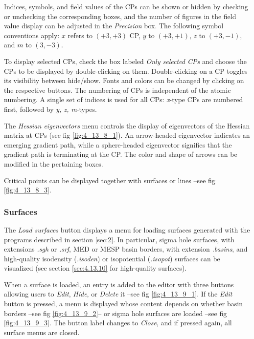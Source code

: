 \documentclass[10pt]{article}
\begin{document}
Indices, symbols, and field values of the CPs can be shown or hidden by checking or unchecking the 
corresponding boxes, and the number of figures in the field value display can be adjusted in the {\it Precision} box. 
The following symbol conventions apply: $x$ refers to $(+3,+3)$ CP, 
$y$ to $(+3,+1)$, $z$ to $(+3,-1)$, and $m$ to $(3,-3)$.

To display selected CPs, check the box labeled {\it Only selected CPs} and choose the CPs 
to be displayed by double-clicking on them. Double-clicking on a CP toggles its visibility between hide/show.
Fonts and colors can be changed by clicking on the respective buttons. The numbering of CPs is independent of
the atomic numbering. A single set of indices is used for all CPs: {\it x}-type CPs are numbered first, 
followed by {\it y, z, m}-types.

The {\it Hessian eigenvectors} menu controls the display of eigenvectors of 
the Hessian matrix at CPs (see fig \ref{fig:4_13_8_1}).
An arrow-headed eigenvector indicates an emerging gradient path, while a sphere-headed eigenvector signifies that 
the gradient path is terminating at the CP. The color and shape of arrows can be modified in the pertaining 
boxes.

Critical points can be displayed together with surfaces or lines --see fig \ref{fig:4_13_8_3}.


\subsubsection{Surfaces \label{sec:4.13.9}}

The {\it Load surfaces} button displays a menu for loading surfaces
generated with the programs described in section \ref{sec:2}. In particular, 
sigma hole surfaces, with extensions {\it .sgh} or
{\it .srf}, MED or MESP basin borders, with extension 
{\it .basins}, and high-quality isodensity ({\it .isoden}) 
or isopotential ({\it .isopot}) surfaces can be visualized 
(see section \ref{sec:4.13.10} for high-quality surfaces).

When a surface is loaded, an entry is added to the editor with three buttons allowing users to
{\it Edit}, {\it Hide}, or {\it Delete} it --see fig \ref{fig:4_13_9_1}. If the
{\it Edit} button is pressed, a menu is displayed whose content depends on whether basin borders
--see fig \ref{fig:4_13_9_2}-- or sigma hole surfaces are loaded --see fig \ref{fig:4_13_9_3}.
The button label changes to {\it Close}, and if pressed again, all surface menus are closed.
\end{document}
